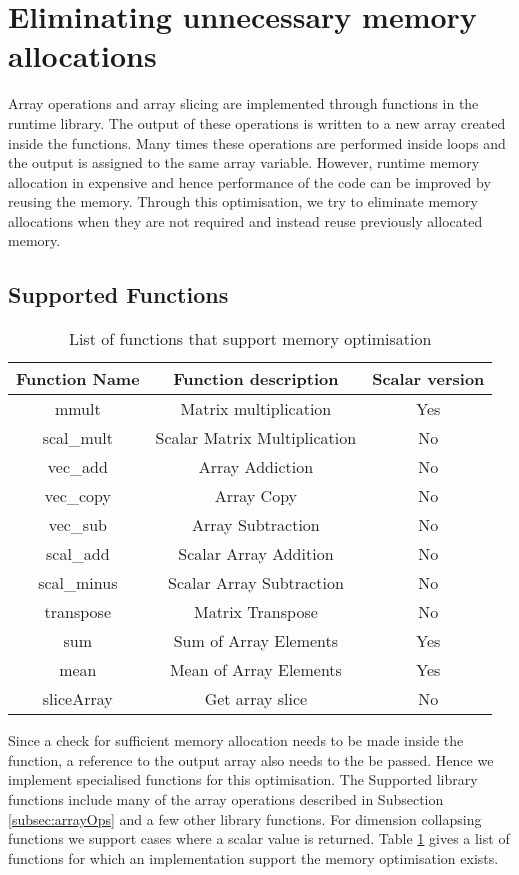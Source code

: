 \section{Eliminating unnecessary memory allocations}
\label{sec:memoptimise}
Array operations and array slicing are implemented through functions in the runtime library. The output of these operations is written to a new array created inside the functions. Many times these operations are performed inside loops and the output is assigned to the same array variable. However, runtime memory allocation in expensive and hence performance of the code can be improved by reusing the memory. Through this optimisation, we try to eliminate memory allocations when they are not required and instead reuse previously allocated memory. 
\subsection{Supported Functions}
\begin{table}[htbp]
\centering
\begin{tabular}{|c|c|c|}
\hline
Function Name & Function description         & Scalar version \\ \hline
mmult         & Matrix multiplication        & Yes            \\ \hline
scal\_mult    & Scalar Matrix Multiplication & No             \\ \hline
vec\_add      & Array Addiction              & No             \\ \hline
vec\_copy     & Array Copy                   & No             \\ \hline
vec\_sub      & Array Subtraction            & No             \\ \hline
scal\_add     & Scalar Array Addition        & No             \\ \hline
scal\_minus   & Scalar Array Subtraction     & No             \\ \hline
transpose     & Matrix Transpose             & No             \\ \hline
sum           & Sum of Array Elements        & Yes            \\ \hline
mean          & Mean of Array Elements       & Yes            \\ \hline
sliceArray          & Get array slice        & No            \\ \hline
\end{tabular}
\caption{List of functions that support memory optimisation}
\label{tab:memoptimiselist}
\end{table}
Since a check for sufficient memory allocation needs to be made inside the function, a reference to the output array also needs to the be passed. Hence we implement specialised functions for this optimisation. The Supported library functions include many of the  array operations described in Subsection \ref{subsec:arrayOps} and a few other library functions. For dimension collapsing functions we support cases where a scalar value is returned. Table \ref{tab:memoptimiselist} gives a list of functions for which an implementation support the memory optimisation exists. 
